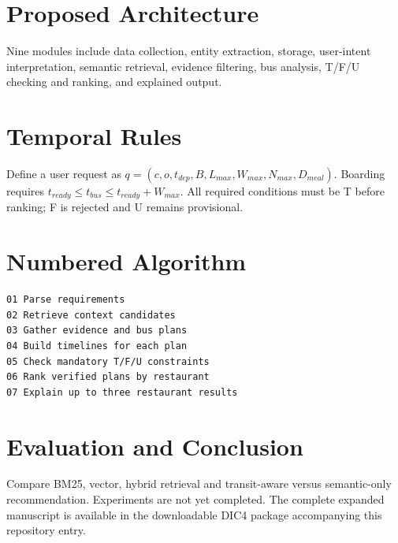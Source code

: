 \documentclass[conference]{IEEEtran}
\begin{document}
\section{Proposed Architecture}Nine modules include data collection, entity extraction, storage, user-intent interpretation, semantic retrieval, evidence filtering, bus analysis, T/F/U checking and ranking, and explained output.
\section{Temporal Rules}Define a user request as $q=(c,o,t_{dep},B,L_{max},W_{max},N_{max},D_{meal})$. Boarding requires $t_{ready}\le t_{bus}\le t_{ready}+W_{max}$. All required conditions must be T before ranking; F is rejected and U remains provisional.
\section{Numbered Algorithm}
\begin{verbatim}
01 Parse requirements
02 Retrieve context candidates
03 Gather evidence and bus plans
04 Build timelines for each plan
05 Check mandatory T/F/U constraints
06 Rank verified plans by restaurant
07 Explain up to three restaurant results
\end{verbatim}
\section{Evaluation and Conclusion}Compare BM25, vector, hybrid retrieval and transit-aware versus semantic-only recommendation. Experiments are not yet completed. The complete expanded manuscript is available in the downloadable DIC4 package accompanying this repository entry.
\end{document}
